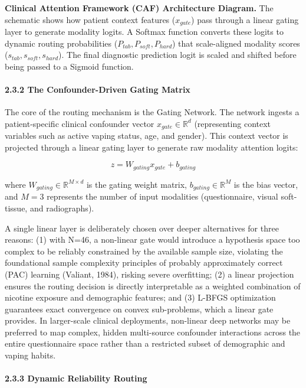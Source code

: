 \documentclass[
]{article}
\begin{document}
\textbf{Clinical Attention Framework (CAF) Architecture Diagram.} The
schematic shows how patient context features (\(x_{gate}\)) pass through
a linear gating layer to generate modality logits. A Softmax function
converts these logits to dynamic routing probabilities
(\(P_{tab},P_{soft},P_{hard}\)) that scale-aligned modality scores
(\(s_{tab},s_{soft},s_{hard}\)). The final diagnostic prediction logit
is scaled and shifted before being passed to a Sigmoid function.

\paragraph{\texorpdfstring{\textbf{2.3.2 The Confounder-Driven Gating
Matrix}}{2.3.2 The Confounder-Driven Gating Matrix}}\label{the-confounder-driven-gating-matrix}

The core of the routing mechanism is the Gating Network. The network
ingests a patient-specific clinical confounder vector
\(x_{gate} \in \mathbb{R}^d\) (representing context variables such as
active vaping status, age, and gender). This context vector is projected
through a linear gating layer to generate raw modality attention logits:

\[z = W_{gating}x_{gate} + b_{gating}\]

where \(W_{gating} \in \mathbb{R}^{M \times d}\) is the gating weight
matrix, \(b_{gating} \in \mathbb{R}^M\) is the bias vector, and
\(M = 3\) represents the number of input modalities (questionnaire,
visual soft-tissue, and radiographs).

A single linear layer is deliberately chosen over deeper alternatives
for three reasons: (1) with N=46, a non-linear gate would introduce a
hypothesis space too complex to be reliably constrained by the available
sample size, violating the foundational sample complexity principles of
probably approximately correct (PAC) learning (Valiant, 1984), risking
severe overfitting; (2) a linear projection ensures the routing decision
is directly interpretable as a weighted combination of nicotine exposure
and demographic features; and (3) L-BFGS optimization guarantees exact
convergence on convex sub-problems, which a linear gate provides. In
larger-scale clinical deployments, non-linear deep networks may be
preferred to map complex, hidden multi-source confounder interactions
across the entire questionnaire space rather than a restricted subset of
demographic and vaping habits.

\paragraph{\texorpdfstring{\textbf{2.3.3 Dynamic Reliability
Routing}}{2.3.3 Dynamic Reliability Routing}}\label{dynamic-reliability-routing}
\end{document}
